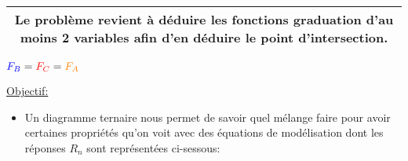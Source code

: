 \documentclass[10pt]{article}
\begin{document}
\color{purple}\begin{tabular}{| c |}

        \hline

        \textbf{Le problème revient à déduire les fonctions graduation d'au moins 2 variables afin d'en déduire le point d'intersection.} \\ \hline

\end{tabular}
\color{black}

\vspace{1cm}

\begin{center}

        \Large $\color{blue}F_{B}\color{black} = \color{red}F_{C}\color{black} = \color{orange}F_{A}\color{black}$ \normalsize

\end{center}

\newpage

\uline{Objectif:}

\vspace{.5cm}

\begin{itemize}

        \item Un diagramme ternaire nous permet de savoir quel mélange faire pour avoir certaines propriétés qu'on voit avec des équations de modélisation dont les réponses $R_{n}$ sont représentées ci-sessous:

\end{itemize}

\vspace{2cm}
\end{document}
